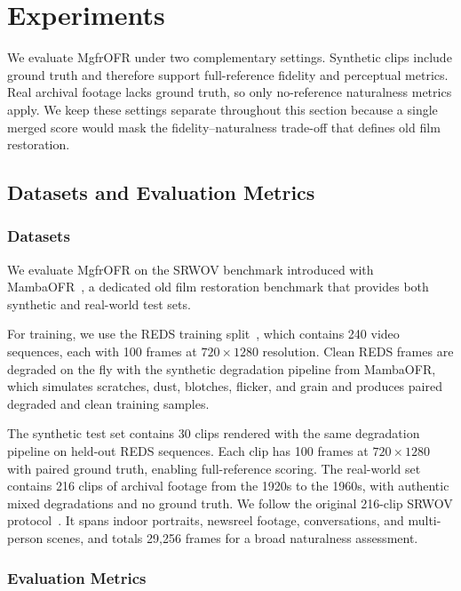 \section{Experiments}
\label{sec:experiment}

We evaluate MgfrOFR under two complementary settings. Synthetic clips include ground truth and therefore support full-reference fidelity and perceptual metrics. Real archival footage lacks ground truth, so only no-reference naturalness metrics apply. We keep these settings separate throughout this section because a single merged score would mask the fidelity--naturalness trade-off that defines old film restoration.

\subsection{Datasets and Evaluation Metrics}
\label{subsec:datasets_metrics}

\subsubsection{Datasets}
\label{subsec:datasets}

We evaluate MgfrOFR on the SRWOV benchmark introduced with MambaOFR~\cite{mao2025mambaofr}, a dedicated old film restoration benchmark that provides both synthetic and real-world test sets.

For training, we use the REDS training split~\cite{nah2019reds}, which contains 240 video sequences, each with 100 frames at $720 \times 1280$ resolution. Clean REDS frames are degraded on the fly with the synthetic degradation pipeline from MambaOFR, which simulates scratches, dust, blotches, flicker, and grain and produces paired degraded and clean training samples.

The synthetic test set contains 30 clips rendered with the same degradation pipeline on held-out REDS sequences. Each clip has 100 frames at $720 \times 1280$ with paired ground truth, enabling full-reference scoring. The real-world set contains 216 clips of archival footage from the 1920s to the 1960s, with authentic mixed degradations and no ground truth. We follow the original 216-clip SRWOV protocol~\cite{mao2025mambaofr}. It spans indoor portraits, newsreel footage, conversations, and multi-person scenes, and totals 29{,}256 frames for a broad naturalness assessment.

\subsubsection{Evaluation Metrics}
\label{subsec:eval_metrics}

